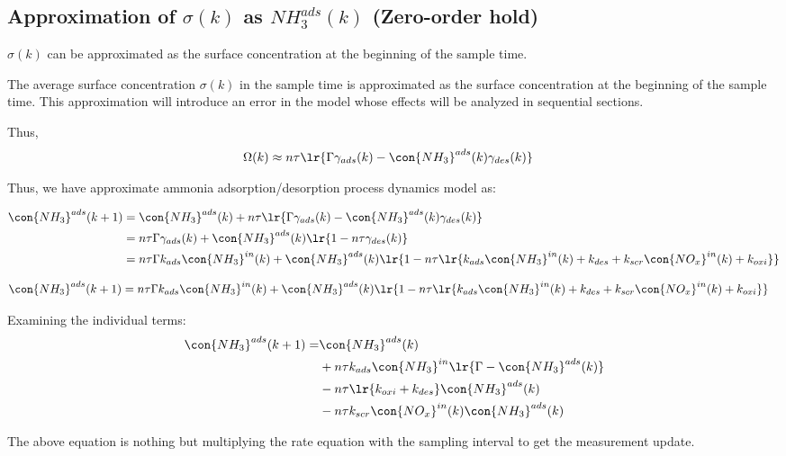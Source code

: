 \subsection{Approximation of $\sigma(k)$ as $NH_3^{ads}(k)$ (Zero-order hold)}
 $\sigma(k)$ can be approximated as the surface concentration at the beginning of the sample time.

The average surface concentration $\sigma(k)$ in the sample time is approximated
as the surface concentration at the beginning of the sample time. This
approximation will introduce an error in the model whose effects will be
analyzed in sequential sections.

Thus,
\begin{align}
    \Omega(k) &\approx n \tau \lr{\Gamma \gamma_{ads} (k) - \con{NH_3}^{ads}(k) \gamma_{des} (k)}
\end{align}

Thus, we have approximate ammonia adsorption/desorption process dynamics model as:

\begin{align*}
    \con{NH_3}^{ads}(k + 1) &= \con{NH_3}^{ads} (k) + n \tau \lr{\Gamma \gamma_{ads} (k) - \con{NH_3}^{ads}(k) \gamma_{des} (k)}\\
    &= n \tau \Gamma \gamma_{ads} (k) + \con{NH_3}^{ads} (k) \lr{1 - n \tau \gamma_{des} (k)}\\
    &= n \tau \Gamma k_{ads} \con{NH_3}^{in}(k)  + \con{NH_3}^{ads} (k) \lr{1 - n \tau \lr{k_{ads} \con{NH_3}^{in}(k) + k_{des} + k_{scr} \con{NO_x}^{in}(k) + k_{oxi}}}
\end{align*}


\begin{align}
    \con{NH_3}^{ads}(k + 1) &= n \tau \Gamma k_{ads} \con{NH_3}^{in}(k)  + \con{NH_3}^{ads} (k) \lr{1 - n \tau \lr{k_{ads} \con{NH_3}^{in}(k) + k_{des} + k_{scr} \con{NO_x}^{in}(k) + k_{oxi}}}
\end{align}

Examining the individual terms:
\begin{align*}
    \con{NH_3}^{ads}(k + 1) =& \con{NH_3}^{ads}(k)\\
        &+ n\tau k_{ads} \con{NH_3}^{in} \lr{\Gamma - \con{NH_3}^{ads}(k)} \\
        &- n \tau \lr{k_{oxi} + k_{des}} \con{NH_3}^{ads} (k)\\
        &- n \tau k_{scr} \con{NO_x}^{in}(k) \con{NH_3}^{ads}(k)
\end{align*}

The above equation is nothing but multiplying the rate equation with the
sampling interval to get the measurement update.

